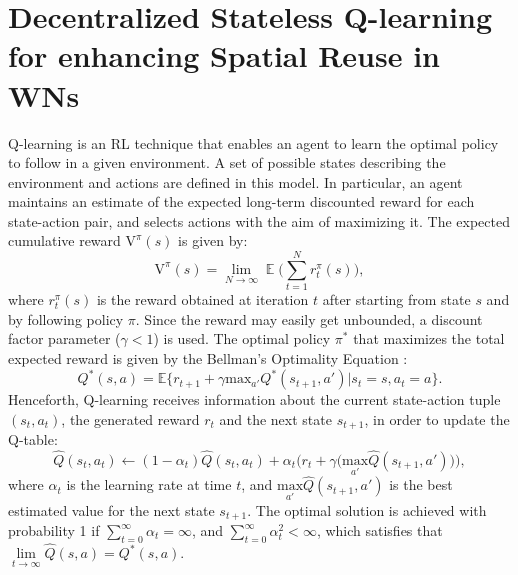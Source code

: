 \documentclass[conference]{IEEEtran}
\begin{document}
	\section{Decentralized Stateless Q-learning for enhancing Spatial Reuse in WNs}
	\label{section:qlearning}	
	Q-learning \cite{sutton1998reinforcement, watkins1992q} is an RL technique that enables an agent to learn the optimal policy to follow in a given environment. A set of possible states describing the environment and actions are defined in this model. In particular, an agent maintains an estimate of the expected long-term discounted reward for each state-action pair, and selects actions with the aim of maximizing it. The expected cumulative reward $\text{V}^\pi(s)$ is given by:
	\begin{equation}
	\label{eq:ql_reward_policy}
	\text{V}^\pi(s) = \lim_{N \rightarrow \infty} \mathop{\mathbb{E}}\Big(\sum_{t=1}^{N} r_t^\pi(s)\Big),
	\nonumber
	\end{equation}
	where $r_t^\pi(s)$ is the reward obtained at iteration $t$ after starting from state $s$ and by following policy $\pi$. Since the reward may easily get unbounded, a discount factor parameter ($\gamma < 1$) is used. The optimal policy $\pi^*$ that maximizes the total expected reward is given by the Bellman's Optimality Equation \cite{sutton1998reinforcement}:	
	\begin{equation}
	Q^*(s,a) = \mathbb{E} \Big\{r_{t+1} + \gamma \text{max}_{a'} Q^*(s_{t+1},a') | s_t = s, a_t = a\Big\}. \nonumber
	\end{equation}	
	Henceforth, Q-learning receives information about the current state-action tuple $(s_t,a_t)$, the generated reward $r_t$ and the next state $s_{t+1}$, in order to update the Q-table: 	
	\begin{equation}
	\hat{Q}(s_t,a_t)\leftarrow (1-\alpha_t) \hat{Q}(s_t,a_t) + \alpha_t \Big(r_t + \gamma \big(\underset{a'}{\text{max}}\hat{Q}(s_{t+1},a')\big)\Big),
	\nonumber
	\end{equation}	
	where $\alpha_t$ is the learning rate at time $t$, and $\underset{a'}{\text{max}}\hat{Q}(s_{t+1},a')$ is the best estimated value for the next state $s_{t+1}$. The optimal solution is achieved with probability 1 if $\sum_{t=0}^{\infty} \alpha_t = \infty$, and $\sum_{t=0}^{\infty} \alpha_t^2 < \infty$, which satisfies that $\underset{t \rightarrow \infty}{\lim} \hat{Q}(s,a) = Q^*(s,a)$.
\end{document}

